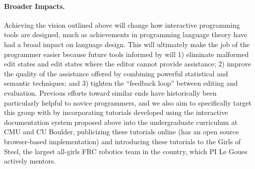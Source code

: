 \vspace{-2px}\paragraph{Broader Impacts.}
Achieving the vision outlined above will change how interactive programming tools are designed, much as achievements in programming language theory have had a broad impact on language design. This will ultimately make the job of the programmer easier because future tools informed by \HazelEnv will 1) eliminate malformed edit states and edit states where the editor cannot provide assistance; 2) improve the quality of the assistance offered by combining powerful statistical and semantic techniques; and 3) tighten the ``feedback loop'' between editing and evaluation. Previous efforts toward similar ends have historically been particularly helpful to novice programmers, and we also aim to specifically target this group with \HazelEnv by incorporating tutorials developed using the interactive documentation system proposed above into the undergraduate curriculum at CMU and CU Boulder, publicizing these tutorials online (\HazelEnv has an open source browser-based implementation) and introducing these tutorials to the Girls of Steel, the largest all-girls FRC robotics team in the country, which PI Le Goues actively mentors.
